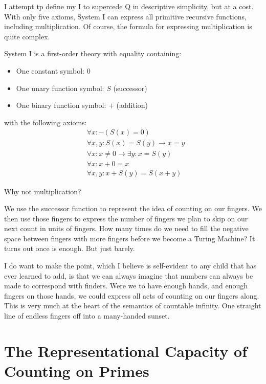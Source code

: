 \documentclass[runningheads]{llncs}
\begin{document}
I attempt tp define my I to supercede Q in descriptive simplicity, but at a cost. With only five axioms, System I can express all primitive recursive functions, including multiplication. Of course, the formula for expressing multiplication is quite complex.

\begin{definition}[System I]
System I is a first-order theory with equality containing:
\begin{itemize}
	\item One constant symbol: $0$
	\item One unary function symbol: $S$ (successor)
	\item One binary function symbol: $+$ (addition)
\end{itemize}
with the following axioms:
\begin{align}
	&\forall x: \neg(S(x) = 0) \tag{I1}\\
	&\forall x,y: S(x) = S(y) \rightarrow x = y \tag{I2}\\
	&\forall x: x \neq 0 \rightarrow \exists y: x = S(y) \tag{I3}\\
	&\forall x: x + 0 = x \tag{I4}\\
	&\forall x,y: x + S(y) = S(x + y) \tag{I5}
\end{align}
\end{definition}
	
Why not multiplication? 

We use the successor function to represent the idea of counting on our fingers. We then use those fingers to express the number of fingers we plan to skip on our next count in units of fingers. How many times do we need to fill the negative space between fingers with more fingers before we become a Turing Machine? It turns out once is enough. But just barely. 

I do want to make the point, which I believe is self-evident to any child that has ever learned to add, is that we can always imagine that numbers can always be made to correspond with finders. Were we to have enough hands, and enough fingers on those hands, we could express all acts of counting on our fingers along. This is very much at the heart of the semantics of countable infinity. One straight line of endless fingers off into a many-handed sunset. 

\section{The Representational Capacity of Counting on Primes}
\end{document}
